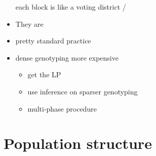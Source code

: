 \documentclass[font=12pt]{article}
\begin{document}
\begin{itemize}
	each block is like a voting district / 
	\item They are 
	\item pretty standard practice
	\item dense genotyping more expensive 
	\begin{itemize}
		\item get the LP
		\item use inference on sparser genotyping 
		\item multi-phase procedure
	\end{itemize}
\end{itemize}

\section{Population structure}
\end{document}
